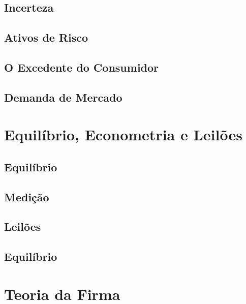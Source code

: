\documentclass[a4paper,11pt,oneside]{book}
\theoremstyle{definition}
\theoremstyle{break}
\begin{document}
\chapter{Incerteza}

\chapter{Ativos de Risco}

\chapter{O Excedente do Consumidor}

\chapter{Demanda de Mercado}

\part{Equilíbrio, Econometria e Leilões}

\chapter{Equilíbrio}

\chapter{Medição}

\chapter{Leilões}

\chapter{Equilíbrio}

\part{Teoria da Firma}
\end{document}
